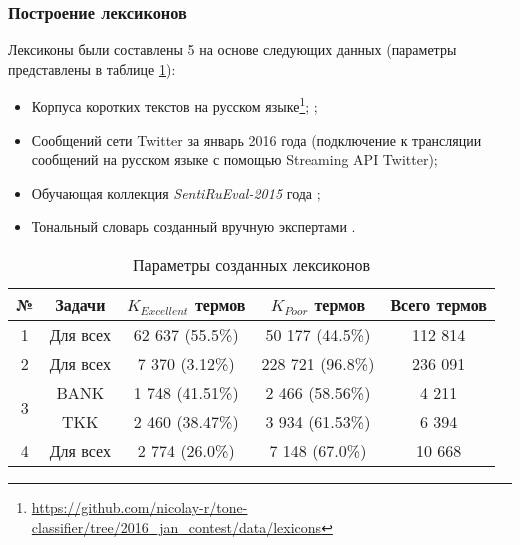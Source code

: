 \subsubsection{Построение лексиконов}

Лексиконы были составлены 5 на основе следующих данных (параметры представлены
в таблице \ref{table:createdLexicons}):

\begin{itemize}
    \item Корпуса коротких текстов на русском языке\footnote{
            \url{https://github.com/nicolay-r/tone-classifier/tree/2016_jan_contest/data/lexicons}
    };
    \cite{rubtsovaLexicon};
    \item Сообщений сети Twitter за январь 2016 года (подключение к трансляции
        сообщений на русском языке с помощью Streaming API Twitter);
    \item Обучающая коллекция {\it SentiRuEval-2015} года \cite{dialog2015};
    \item Тональный словарь созданный вручную экспертами \cite{expertLexicon}.
\end{itemize}

\begin{table}[ht!]
\centering
\caption{Параметры созданных лексиконов}
\label{table:createdLexicons}
\begin{tabular}{|c|c|c|c|c|}
\hline
№                  & \multicolumn{1}{c|}{Задачи} & \multicolumn{1}{c|}{$K_{Excellent}$ термов} & \multicolumn{1}{c|}{$K_{Poor}$ термов} & \multicolumn{1}{c|}{Всего термов} \\ \hline
1                  & Для всех                    & 62 637 (55.5\%)                              & 50 177 (44.5\%)                         & 112 814                            \\ \hline
2                  & Для всех                    & 7 370 (3.12\%)                               & 228 721 (96.8\%)                        & 236 091                            \\ \hline
\multirow{2}{*}{3} & BANK                        & 1 748 (41.51\%)                              & 2 466 (58.56\%)                         & 4 211                              \\ \cline{2-5}
                   & TKK                         & 2 460 (38.47\%)                              & 3 934 (61.53\%)                         & 6 394                              \\ \hline
4                  & Для всех                    & 2 774 (26.0\%)                               & 7 148 (67.0\%)                          & 10 668                             \\ \hline
\end{tabular}
\end{table}

